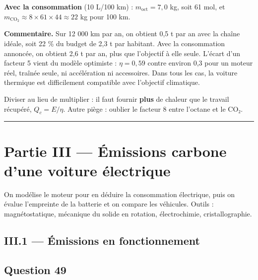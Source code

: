 \documentclass[11pt,a4paper]{article}
\begin{document}
\textbf{Avec la consommation} (10 L/100 km) : \(m_{\text{oct}}=7{,}0\) kg, soit 61 mol, et \(m_{\text{CO}_2}\approx8\times61\times44\approx22\) kg pour 100 km.

\textbf{Commentaire.} Sur 12 000 km par an, on obtient 0,5 t par an avec la chaîne idéale, soit 22 \% du budget de 2,3 t par habitant. Avec la consommation annoncée, on obtient 2,6 t par an, plus que l'objectif à elle seule. L'écart d'un facteur 5 vient du modèle optimiste : \(\eta=0{,}59\) contre environ 0,3 pour un moteur réel, traînée seule, ni accélération ni accessoires. Dans tous les cas, la voiture thermique est difficilement compatible avec l'objectif climatique.

\begin{piege}

Diviser au lieu de multiplier : il faut fournir \textbf{plus} de chaleur que le travail récupéré, \(Q_c=E/\eta\). Autre piège : oublier le facteur 8 entre l'octane et le CO₂.

\end{piege}

\begin{center}\rule{0.5\linewidth}{0.5pt}\end{center}

\hypertarget{partie-iii-uxe9missions-carbone-dune-voiture-uxe9lectrique}{%
\section{Partie III --- Émissions carbone d'une voiture électrique}\label{partie-iii-uxe9missions-carbone-dune-voiture-uxe9lectrique}}

On modélise le moteur pour en déduire la consommation électrique, puis on évalue l'empreinte de la batterie et on compare les véhicules. Outils : magnétostatique, mécanique du solide en rotation, électrochimie, cristallographie.

\hypertarget{iii.1-uxe9missions-en-fonctionnement}{%
\subsection{III.1 --- Émissions en fonctionnement}\label{iii.1-uxe9missions-en-fonctionnement}}

\hypertarget{question-49}{%
\subsection{Question 49}\label{question-49}}
\end{document}
